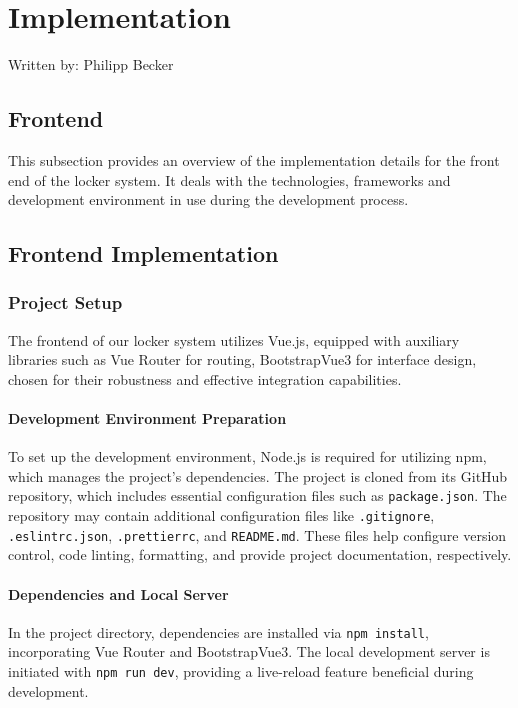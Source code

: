 \section{Implementation}
{\tiny Written by: Philipp Becker}
\subsection{Frontend} \label{sec:Frontend_Implementation}
This subsection provides an overview of the implementation details for the front end of the locker system. It deals with the technologies, frameworks and development environment in use during the development process.

\subsection{Frontend Implementation}
\subsubsection{Project Setup}

The frontend of our locker system utilizes Vue.js, equipped with auxiliary libraries such as Vue Router for routing,  BootstrapVue3 for interface design, chosen for their robustness and effective integration capabilities.

\paragraph{Development Environment Preparation}
To set up the development environment, Node.js is required for utilizing npm, which manages the project's dependencies. The project is cloned from its GitHub repository, which includes essential configuration files such as \texttt{package.json}. The repository may contain additional configuration files like \texttt{.gitignore}, \texttt{.eslintrc.json}, \texttt{.prettierrc}, and \texttt{README.md}. These files help configure version control, code linting, formatting, and provide project documentation, respectively.



\paragraph{Dependencies and Local Server}
In the project directory, dependencies are installed via \texttt{npm install}, incorporating Vue Router and BootstrapVue3. The local development server is initiated with \texttt{npm run dev}, providing a live-reload feature beneficial during development.

